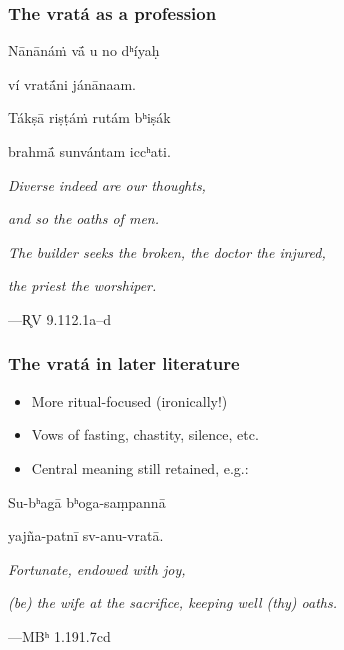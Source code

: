 \documentclass[pdf]{beamer}
\begin{document}
\begin{frame} \frametitle{The vratá as a profession}
\begin{center}
	Nānānáṁ vā́ u no dʰíyaḥ

	ví vratā́ni jánānaam.

	Tákṣā riṣṭáṁ rutám bʰiṣák

	brahmā́ sunvántam iccʰati.

	\vspace{12pt}

	\textit{Diverse indeed are our thoughts,}

	\textit{and so the oaths of men.}

	\textit{The builder seeks the broken, the doctor the injured,}

	\textit{the priest the worshiper.}

	\vspace{12pt}

 	---R̥V 9.112.1a--d
\end{center}
\end{frame}

\begin{frame} \frametitle{The vratá in later literature}
\begin{itemize}
	\item More ritual-focused (ironically!)
	\item Vows of fasting, chastity, silence, etc.
	\item Central meaning still retained, e.g.:
\end{itemize}
\begin{center}
	Su-bʰagā bʰoga-saṃpannā

	yajña-patnī sv-anu-vratā.

	\vspace{12pt}

	\textit{Fortunate, endowed with joy,}

	\textit{(be) the wife at the sacrifice, keeping well (thy) oaths.}

	\vspace{12pt}

 	---MBʰ 1.191.7cd
\end{center}
\end{frame}

\end{document}
